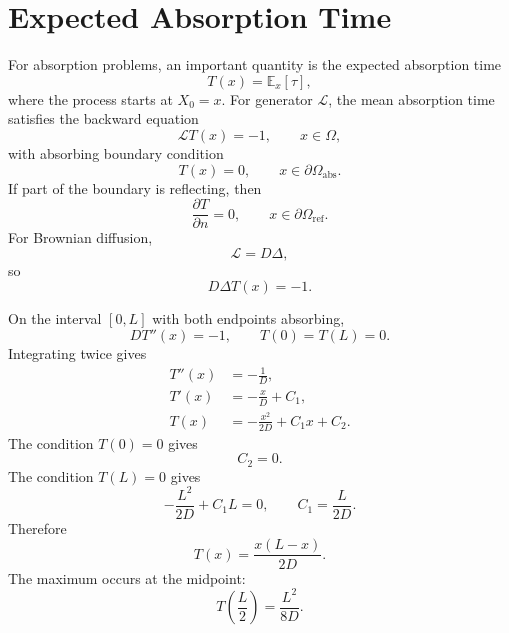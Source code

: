 \documentclass[11pt,a4paper]{article}
\numberwithin{equation}{section}
\newcommand{\E}{\mathbb{E}}
\begin{document}
\section{Expected Absorption Time}

For absorption problems, an important quantity is the expected absorption time
\begin{equation}
  T(x)=\E_x[\tau],
  \label{eq:mean-absorption-time}
\end{equation}
where the process starts at \(X_0=x\). For generator \(\mathcal{L}\), the mean absorption time satisfies the backward equation
\begin{equation}
  \mathcal{L}T(x)=-1,
  \qquad x\in\Omega,
  \label{eq:backward-mean-time}
\end{equation}
with absorbing boundary condition
\begin{equation}
  T(x)=0,
  \qquad x\in\partial\Omega_{\mathrm{abs}}.
  \label{eq:mean-time-absorbing-bc}
\end{equation}
If part of the boundary is reflecting, then
\begin{equation}
  \frac{\partial T}{\partial n}=0,
  \qquad x\in\partial\Omega_{\mathrm{ref}}.
  \label{eq:mean-time-reflecting-bc}
\end{equation}
For Brownian diffusion,
\begin{equation}
  \mathcal{L}=D\Delta,
  \label{eq:brownian-generator}
\end{equation}
so
\begin{equation}
  D\Delta T(x)=-1.
  \label{eq:brownian-mean-time}
\end{equation}

On the interval \([0,L]\) with both endpoints absorbing,
\begin{equation}
  DT''(x)=-1,
  \qquad
  T(0)=T(L)=0.
  \label{eq:two-absorbing-bvp}
\end{equation}
Integrating twice gives
\begin{align}
  T''(x)&=-\frac{1}{D}, \label{eq:two-absorbing-step1}\\
  T'(x)&=-\frac{x}{D}+C_1, \label{eq:two-absorbing-step2}\\
  T(x)&=-\frac{x^2}{2D}+C_1x+C_2. \label{eq:two-absorbing-step3}
\end{align}
The condition \(T(0)=0\) gives
\begin{equation}
  C_2=0.
  \label{eq:c2-zero}
\end{equation}
The condition \(T(L)=0\) gives
\begin{equation}
  -\frac{L^2}{2D}+C_1L=0,
  \qquad
  C_1=\frac{L}{2D}.
  \label{eq:c1-two-absorbing}
\end{equation}
Therefore
\begin{equation}
  T(x)=\frac{x(L-x)}{2D}.
  \label{eq:two-absorbing-solution}
\end{equation}
The maximum occurs at the midpoint:
\begin{equation}
  T\left(\frac{L}{2}\right)
  =\frac{L^2}{8D}.
  \label{eq:two-absorbing-midpoint}
\end{equation}
\end{document}
